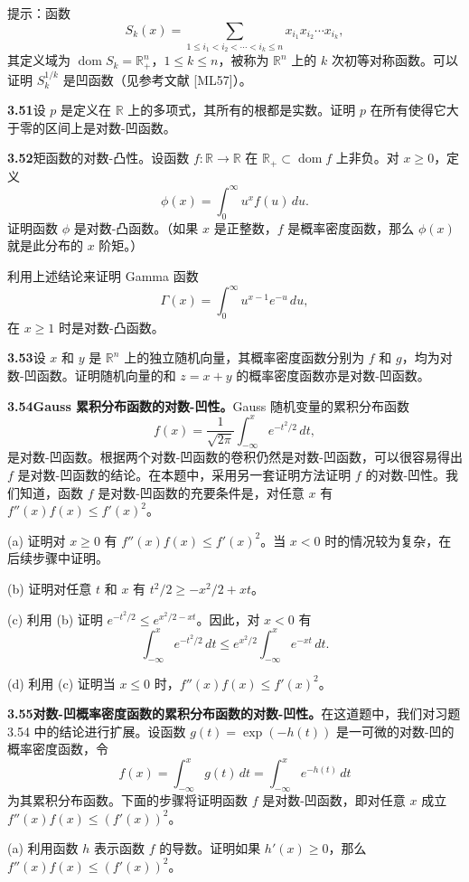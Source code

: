 \documentclass[UTF8, 12pt, fontset=fandol, oneside]{ctexart}
\DeclareMathOperator{\dom}{dom}
\begin{document}
提示：函数
\[
S_k(x)=\sum_{1\leq i_1<i_2<\cdots<i_k\leq n}x_{i_1}x_{i_2}\cdots x_{i_k},
\]
其定义域为 $\dom S_k=\mathbb{R}_+^n$，$1\leq k\leq n$，被称为 $\mathbb{R}^n$ 上的 $k$ 次初等对称函数。可以证明 $S_k^{1/k}$ 是凹函数（见参考文献 [ML57]）。

\noindent\textbf{3.51}\quad [BL00，第 41 页] 设 $p$ 是定义在 $\mathbb{R}$ 上的多项式，其所有的根都是实数。证明 $p$ 在所有使得它大于零的区间上是对数-凹函数。

\noindent\textbf{3.52}\quad [MO79，\S3.E.2] 矩函数的对数-凸性。设函数 $f:\mathbb{R}\to\mathbb{R}$ 在 $\mathbb{R}_+\subset\dom f$ 上非负。对 $x\geq0$，定义
\[
\phi(x)=\int_0^\infty u^x f(u)\,du.
\]
证明函数 $\phi$ 是对数-凸函数。（如果 $x$ 是正整数，$f$ 是概率密度函数，那么 $\phi(x)$ 就是此分布的 $x$ 阶矩。）

利用上述结论来证明 Gamma 函数
\[
\Gamma(x)=\int_0^\infty u^{x-1}e^{-u}\,du,
\]
在 $x\geq1$ 时是对数-凸函数。

\noindent\textbf{3.53}\quad 设 $x$ 和 $y$ 是 $\mathbb{R}^n$ 上的独立随机向量，其概率密度函数分别为 $f$ 和 $g$，均为对数-凹函数。证明随机向量的和 $z=x+y$ 的概率密度函数亦是对数-凹函数。

\noindent\textbf{3.54\quad Gauss 累积分布函数的对数-凹性。}\quad Gauss 随机变量的累积分布函数
\[
f(x)=\frac{1}{\sqrt{2\pi}}\int_{-\infty}^x e^{-t^2/2}\,dt,
\]
是对数-凹函数。根据两个对数-凹函数的卷积仍然是对数-凹函数，可以很容易得出 $f$ 是对数-凹函数的结论。在本题中，采用另一套证明方法证明 $f$ 的对数-凹性。我们知道，函数 $f$ 是对数-凹函数的充要条件是，对任意 $x$ 有 $f''(x)f(x)\leq f'(x)^2$。

(a) 证明对 $x\geq0$ 有 $f''(x)f(x)\leq f'(x)^2$。当 $x<0$ 时的情况较为复杂，在后续步骤中证明。

(b) 证明对任意 $t$ 和 $x$ 有 $t^2/2\geq -x^2/2+xt$。

(c) 利用 (b) 证明 $e^{-t^2/2}\leq e^{x^2/2-xt}$。因此，对 $x<0$ 有
\[
\int_{-\infty}^x e^{-t^2/2}\,dt\leq e^{x^2/2}\int_{-\infty}^x e^{-xt}\,dt.
\]

(d) 利用 (c) 证明当 $x\leq0$ 时，$f''(x)f(x)\leq f'(x)^2$。

\noindent\textbf{3.55\quad 对数-凹概率密度函数的累积分布函数的对数-凹性。}\quad 在这道题中，我们对习题 3.54 中的结论进行扩展。设函数 $g(t)=\exp(-h(t))$ 是一可微的对数-凹的概率密度函数，令
\[
f(x)=\int_{-\infty}^x g(t)\,dt=\int_{-\infty}^x e^{-h(t)}\,dt
\]
为其累积分布函数。下面的步骤将证明函数 $f$ 是对数-凹函数，即对任意 $x$ 成立 $f''(x)f(x)\leq(f'(x))^2$。

(a) 利用函数 $h$ 表示函数 $f$ 的导数。证明如果 $h'(x)\geq0$，那么 $f''(x)f(x)\leq(f'(x))^2$。
\end{document}

